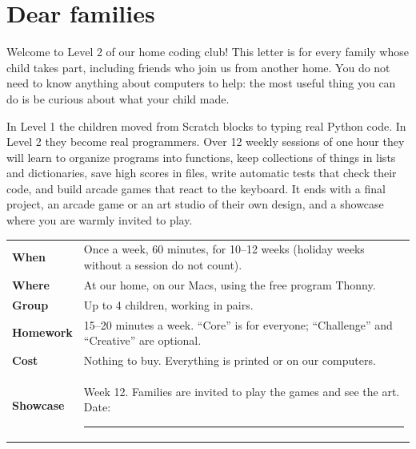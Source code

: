 \documentclass[level=2]{kidscode}
\begin{document}

\section{Dear families}
Welcome to Level 2 of our home coding club! This letter is for every family whose child takes part,
including friends who join us from another home. You do not need to know anything about
computers to help: the most useful thing you can do is be curious about what your child made.

In Level 1 the children moved from Scratch blocks to typing real Python code. In Level 2 they
become real programmers. Over 12 weekly sessions of one hour they will learn to organize programs
into functions, keep collections of things in lists and dictionaries, save high scores in files,
write automatic tests that check their code, and build arcade games that react to the keyboard.
It ends with a final project, an arcade game or an art studio of their own design, and a
showcase where you are warmly invited to play.

\begin{tabularx}{\linewidth}{@{}>{\bfseries}p{4.2cm}X@{}}
\toprule
When & Once a week, 60 minutes, for 10--12 weeks (holiday weeks without a session do not count). \\
Where & At our home, on our Macs, using the free program Thonny. \\
Group & Up to 4 children, working in pairs. \\
Homework & 15--20 minutes a week. \enquote{Core} is for everyone; \enquote{Challenge} and \enquote{Creative} are optional. \\
Cost & Nothing to buy. Everything is printed or on our computers. \\
Showcase & Week 12. Families are invited to play the games and see the art. Date: \rule{4cm}{0.4pt} \\
\bottomrule
\end{tabularx}
\end{document}
